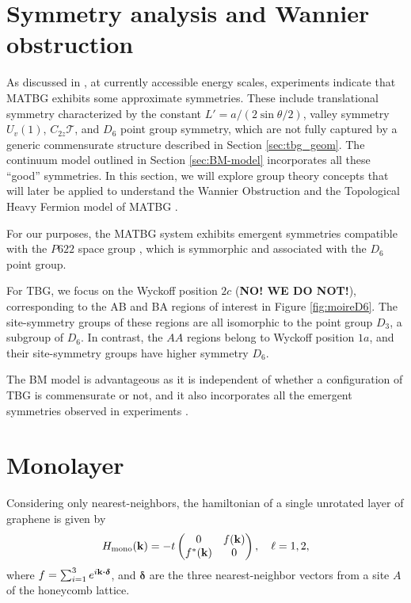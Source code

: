 \section{Symmetry analysis and Wannier obstruction} \label{sec:wannier_obstruction}

As discussed in \cite{zou2018}, at currently accessible energy scales, experiments indicate that MATBG exhibits some approximate symmetries. These include translational symmetry characterized by the constant $L' = a / (2 \sin\theta/2)$, valley symmetry $U_v(1)$, $C_{2z} \mathcal{T}$, and $D_6$ point group symmetry, which are not fully captured by a generic commensurate structure described in Section \ref{sec:tbg_geom}. The continuum model outlined in Section \ref{sec:BM-model} incorporates all these ``good'' symmetries. In this section, we will explore group theory concepts that will later be applied to understand the Wannier Obstruction \cite{zou2018} and the Topological Heavy Fermion model of MATBG \cite{topoheavyfermion2022}.

For our purposes, the MATBG system exhibits emergent symmetries compatible with the $P622$ space group \cite{thesis_rennella}, which is symmorphic and associated with the $D_6$ point group.

For TBG, we focus on the Wyckoff position $2c$ (\textbf{NO! WE DO NOT!}), corresponding to the AB and BA regions of interest in Figure \ref{fig:moireD6}. The site-symmetry groups of these regions are all isomorphic to the point group $D_3$, a subgroup of $D_6$. In contrast, the $AA$ regions belong to Wyckoff position $1a$, and their site-symmetry groups have higher symmetry $D_6$.

The BM model is advantageous as it is independent of whether a configuration of TBG is commensurate or not, and it also incorporates all the emergent symmetries observed in experiments \cite{zou2018}.

\section{Monolayer}

Considering only nearest-neighbors, the hamiltonian of a single unrotated layer of graphene is given by
$$
H_{\text{mono}}({\vb{k}}) = -t
\begin{pmatrix}
0 & f({\vb{k}}) \\
f^*({\vb{k}}) & 0
\end{pmatrix}
, \quad \ell = 1, 2,
$$
where $f = \sum_{i=1}^{3} e^{i \k \vdot \bm{\delta}}$, and $\bm{\delta}$ are the three nearest-neighbor vectors from a site $A$ of the honeycomb lattice.

